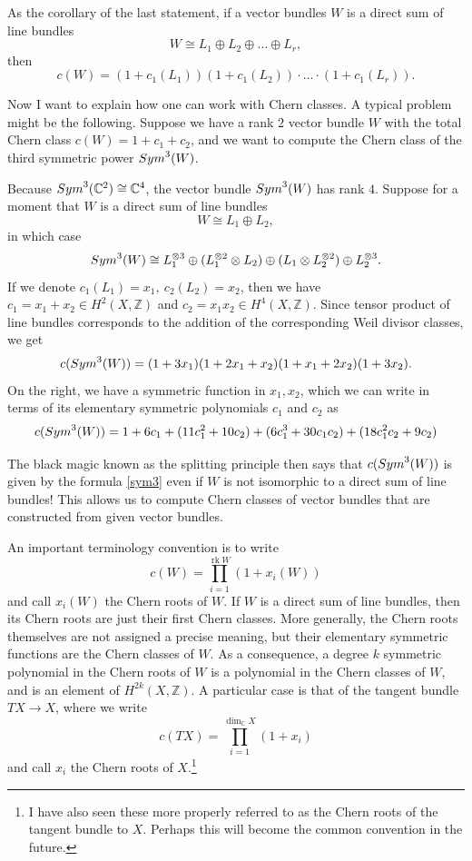 \documentclass[11pt]{article}
\numberwithin{equation}{section}
\numberwithin{footnote}{section}
\newcommand{\blue}{\color{blue}}
\newcommand{\Z}{{\mathbb Z}}
\newcommand{\C}{{\mathbb C}}
\DeclareMathOperator{\rk}{rk}
\begin{document}
 As the corollary of the last statement, if a vector bundles $W$ is a direct sum of line bundles
$$
 W \cong L_1 \oplus L_2\oplus \ldots \oplus L_r,
$$
then 
$$
c(W) = (1+ c_1(L_1))(1+c_1(L_2))\cdot\ldots\cdot (1+c_1(L_r)).
$$

\smallskip{\blue \hrule}
Now I want to explain  how one can work with Chern classes. A typical problem might be the following. Suppose we have a rank $2$ vector bundle $W$ with the total Chern class $c(W) = 1+ c_1 +c_2$, and we want to compute the Chern class of the third symmetric power ${\rm Sym}^3(W)$.

\smallskip
Because ${\rm Sym}^3(\C^2)\cong \C^4$, the vector bundle ${\rm Sym}^3(W)$ has rank $4$.
Suppose for a moment that $W$ is a direct sum of line bundles 
$$W \cong L_1\oplus L_2,$$
in which case 
$${\rm Sym}^3(W)\cong L_1^{\otimes 3} \oplus (L_1^{\otimes 2} \otimes L_2 )\oplus  (L_1 \otimes L_2^{\otimes 2})\oplus L_2^{\otimes 3}.
$$ 
If we denote $c_1(L_1) = x_1,~c_2(L_2)=x_2$, then we have $c_1=x_1+x_2\in H^2(X,\Z)$ and $c_2 = x_1 x_2 \in H^4(X,\Z)$. Since tensor product of line bundles corresponds to the addition of the corresponding Weil divisor classes, we get
$$
c({\rm Sym}^3(W)) = (1+3x_1)(1+2x_1+x_2)(1+x_1+2x_2)(1+3x_2).
$$
On the right, we have a symmetric function in $x_1,x_2$, which we can write in terms of its elementary symmetric polynomials $c_1$ and $c_2$ as
\begin{equation}\label{sym3}
c({\rm Sym}^3(W)) = 1 + 6c_1 + (11c_1^2 + 10c_2) + (6c_1^3 + 30 c_1 c_2) + (18 c_1^2 c_2 + 9c_2)
\end{equation}

The black magic known as the {\blue splitting principle} then says that $c({\rm Sym}^3(W))$ is given by the formula \eqref{sym3} even if $W$ is not isomorphic to a direct sum of line bundles! This allows us to compute Chern classes of vector bundles that are constructed from given vector bundles.

\smallskip
An important terminology convention is to write 
$$c(W) = \prod_{i=1}^{\rk W} (1+ x_i(W))$$
and call $x_i(W)$ the {\blue Chern roots} of $W$. If $W$ is a direct sum of line bundles, then its Chern roots are just their first Chern classes. More generally, the Chern roots themselves are not assigned a precise meaning, but their elementary symmetric functions are the Chern classes of $W$. As a consequence, a degree $k$ symmetric polynomial in the Chern roots of $W$ is a polynomial in the Chern classes of $W$, and is an element of $H^{2k}(X,\Z)$.
A particular case is that of the tangent bundle $TX\to X$, where we write
$$
c(TX) = \prod_{i=1}^{\dim_\C X} (1+x_i)
$$
and call $x_i$ the Chern roots of $X$.\footnote{ I have also seen these more properly referred to as the Chern roots of the tangent bundle to $X$. Perhaps this will become the common convention in the future.}
\end{document}
